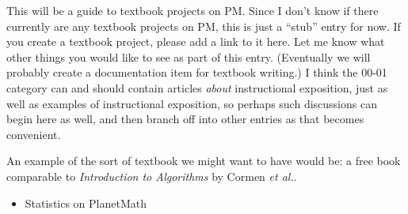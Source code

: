 \documentclass[12pt]{article}
\begin{document}
This will be a guide to textbook projects on PM.  Since I don't know
if there currently are any textbook projects on PM, this is just a
``stub'' entry for now.  If you create a textbook project, please add
a link to it here.  Let me know what other things you would like to
see as part of this entry.  (Eventually we will probably create a
documentation item for textbook writing.)  I think the 00-01 category
can and should contain articles \emph{about} instructional exposition,
just as well as examples of instructional exposition, so perhaps such
discussions can begin here as well, and then branch off into other
entries as that becomes convenient.

An example of the sort of textbook we might want to have would
be: a free book comparable to \emph{Introduction to Algorithms} by 
Cormen \emph{et al.}.

\begin{itemize}
\item Statistics on PlanetMath
\end{itemize}

\end{document}
